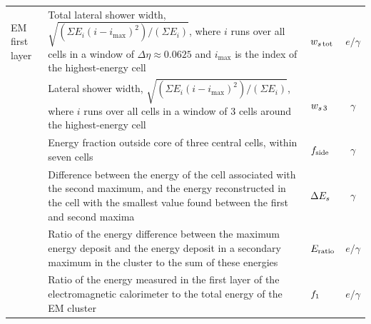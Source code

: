 \begin{table}[htbp]
\begin{tabular}{
  l
  >{\RaggedRight}p{}
  lc}
  EM first layer
  & Total lateral shower width, $\sqrt{(\Sigma E_i
    (i-i_\mathrm{max})^2)/(\Sigma E_i)}$, where $i$ runs over all
    cells in a window of $\Delta\eta \approx 0.0625$ and
    $i_{\textrm{max}}$ is the index of the highest-energy cell
     & $w_{s\,\mathrm{tot}}$ & $e/\gamma$ \\
  & Lateral shower width,
    $\sqrt{(\Sigma E_i (i - i_{\textrm{max}})^2)/(\Sigma E_i)}$,
    where $i$ runs over all cells in a window of 3 cells around the
    highest-energy cell & $w_{s\,3}$ & $\gamma$ \\
  & Energy fraction outside core of three central cells, within seven cells   & $f_\mathrm{side}$ & $\gamma$ \\
  & Difference between the energy of the cell associated with the
    second maximum, and the energy reconstructed
    in the cell with the smallest value found between the first and
    second maxima  & $\Delta E_s$ & $\gamma$ \\
  & Ratio of the energy difference between the maximum energy deposit and the energy deposit in a secondary maximum in the cluster to the sum of these energies   & $E_{\mathrm{ratio}}$ & $e/\gamma$ \\
  & Ratio of the energy measured in the first layer of the electromagnetic calorimeter to the total energy of the
    EM cluster & $f_1$ & $e/\gamma$ \\


\end{tabular}
\end{table}
